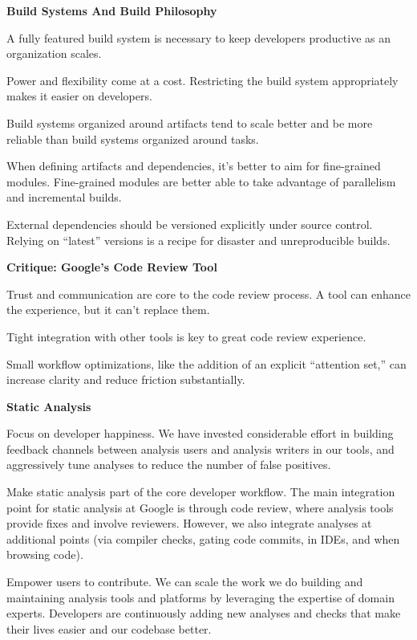 \item \textbf{Build Systems And Build Philosophy}
\bit
\item A fully featured build system is necessary to keep developers productive as an organization scales.
\item Power and flexibility come at a cost. Restricting the build system appropriately makes it easier on developers.
\item Build systems organized around artifacts tend to scale better and be more reliable than build systems organized
around tasks.
\item When defining artifacts and dependencies, it's better to aim for fine-grained modules. Fine-grained modules are
better able to take advantage of parallelism and incremental builds.
\item External dependencies should be versioned explicitly under source control. Relying on ``latest'' versions is a
recipe for disaster and unreproducible builds.
\eit

\item \textbf{Critique: Google's Code Review Tool}
\bit
\item Trust and communication are core to the code review process. A tool can enhance the experience, but it can't
replace them.
\item Tight integration with other tools is key to great code review experience.
\item Small workflow optimizations, like the addition of an explicit ``attention set,'' can increase clarity and
reduce friction substantially.
\eit

\item \textbf{Static Analysis}
\bit
\item Focus on developer happiness. We have invested considerable effort in building feedback channels between
analysis users and analysis writers in our tools, and aggressively tune analyses to reduce the number of false
positives.
\item Make static analysis part of the core developer workflow. The main integration point for static analysis at
Google is through code review, where analysis tools provide fixes and involve reviewers. However, we also integrate
analyses at additional points (via compiler checks, gating code commits, in IDEs, and when browsing code).
\item Empower users to contribute. We can scale the work we do building and maintaining analysis tools and platforms
by leveraging the expertise of domain experts. Developers are continuously adding new analyses and checks that make
their lives easier and our codebase better.
\eit

